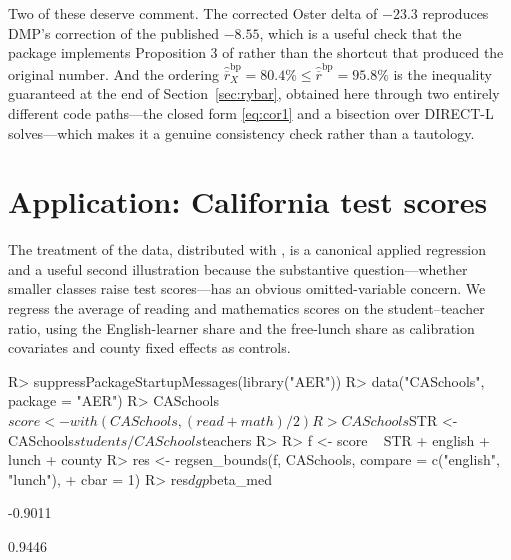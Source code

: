 \documentclass[article]{jss}\usepackage[]{graphicx}\usepackage[]{xcolor}
\begin{document}
Two of these deserve comment. The corrected Oster delta of
$-23.3$ reproduces DMP's correction of the published
$-8.55$, which is a useful check that the package implements Proposition 3
of \citet{Oster2019} rather than the shortcut that produced the original
number. And the ordering
$\hat{\overline{r}}^{\mathrm{bp}}_X = 80.4\%
\le \hat{\overline{r}}^{\mathrm{bp}} = 95.8\%$
is the inequality guaranteed at the end of Section~\ref{sec:rybar},
obtained here through two entirely different code paths---the closed form
\eqref{eq:cor1} and a bisection over DIRECT-L solves---which makes it a
genuine consistency check rather than a tautology.

\section{Application: California test scores}\label{sec:case-school}

The \citet{StockWatson2011} treatment of the  data,
distributed with  \citep{AER}, is a canonical applied regression
and a useful second illustration because the substantive question---whether
smaller classes raise test scores---has an obvious omitted-variable
concern. We regress the average of reading and mathematics scores on the
student--teacher ratio, using the English-learner share and the
free-lunch share as calibration covariates and county fixed effects as
controls.

\begin{Schunk}
\begin{Sinput}
R> suppressPackageStartupMessages(library("AER"))
R> data("CASchools", package = "AER")
R> CASchools$score <- with(CASchools, (read + math) / 2)
R> CASchools$STR   <- CASchools$students / CASchools$teachers
R> 
R> f <- score ~ STR + english + lunch + county
R> res <- regsen_bounds(f, CASchools, compare = c("english", "lunch"),
+                       cbar = 1)
R> res$dgp$beta_med
\end{Sinput}
\begin{Soutput}
[1] -0.9011
\end{Soutput}
\begin{Soutput}
[1] 0.9446
\end{Soutput}
\end{Schunk}
\end{document}
